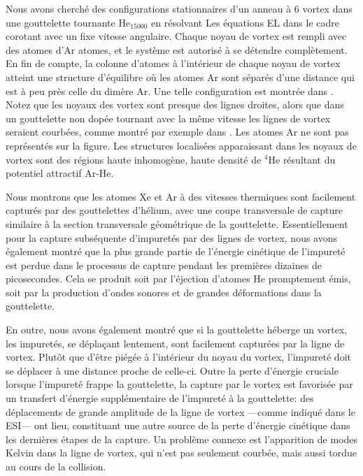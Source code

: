Nous avons cherché des configurations stationnaires d'un anneau à 6 vortex
dans une gouttelette tournante He$_{15000}$ en résolvant
Les équations EL dans le cadre corotant avec un fixe
vitesse angulaire. Chaque noyau de vortex est rempli avec des atomes d'Ar
atomes, et le système est autorisé à se détendre complètement.
En fin de compte, la colonne d'atomes à l'intérieur de chaque noyau de vortex atteint une structure d'équilibre
où les atomes Ar sont séparés d'une distance qui est à peu près celle du dimère Ar.
Une telle configuration est montrée dans . Notez que
les noyaux des vortex sont presque des lignes droites, alors que dans un
gouttelette non dopée tournant avec la même vitesse
les lignes de vortex seraient courbées,
comme montré par exemple dans .
Les atomes Ar ne sont pas représentés sur la figure.
Les structures localisées apparaissant dans les noyaux de vortex sont des régions haute inhomogène, haute densité de $^4$He
résultant du potentiel attractif Ar-He.

Nous montrons que les atomes Xe et Ar à des vitesses thermiques sont facilement capturés par des gouttelettes d'hélium, avec une coupe transversale de capture similaire à la section transversale géométrique de la gouttelette. Essentiellement pour la capture subséquente d'impuretés par des lignes de vortex, nous avons également montré que la plus grande partie de l'énergie cinétique de l'impureté est perdue dans le processus de capture pendant les premières dizaines de picosecondes. Cela se produit soit par l'éjection d'atomes He promptement émis, soit par la production d'ondes sonores et de grandes déformations dans la gouttelette.

En outre, nous avons également montré que si la gouttelette héberge un vortex, les impuretés, se déplaçant lentement, sont facilement capturées par la ligne de vortex. Plutôt que d'être piégée à l'intérieur du noyau du vortex, l'impureté doit se déplacer à une distance proche de celle-ci. Outre la perte d'énergie cruciale lorsque l'impureté frappe la gouttelette, la capture par le vortex est favorisée par un transfert d'énergie supplémentaire de l'impureté à la gouttelette: des déplacements de grande amplitude de la ligne de vortex ---comme indiqué dans le ESI\citep{ESI}--- ont lieu, constituant une autre source de la perte d'énergie cinétique dans les dernières étapes de la capture. Un problème connexe est l'apparition de modes Kelvin dans la ligne de vortex, qui n'est pas seulement courbée, mais aussi tordue au cours de la collision.

